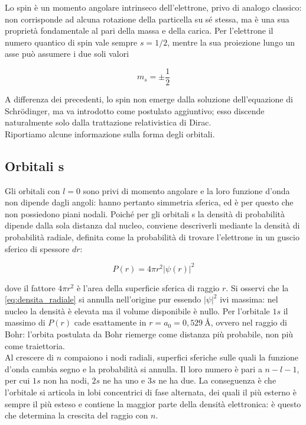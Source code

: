 Lo spin è un momento angolare intrinseco dell'elettrone, privo di analogo classico: non corrisponde ad alcuna rotazione della particella su sé stessa, ma è una sua proprietà fondamentale al pari della massa e della carica. 
Per l'elettrone il numero quantico di spin vale sempre $s = 1/2$, mentre la sua proiezione lungo un asse può assumere i due soli valori

\begin{equation}
    m_s = \pm \frac{1}{2}
    \label{eq:spin}
\end{equation}

A differenza dei precedenti, lo spin non emerge dalla soluzione dell'equazione di Schrödinger, ma va introdotto come postulato aggiuntivo; esso discende naturalmente solo dalla trattazione relativistica di Dirac.\\

Riportiamo alcune informazione sulla forma degli orbitali.

\subsection{Orbitali s}

Gli orbitali con $l = 0$ sono privi di momento angolare e la loro funzione d'onda non dipende dagli angoli: hanno pertanto simmetria sferica, ed è per questo che non possiedono piani nodali. Poiché per gli orbitali s la densità di probabilità dipende dalla sola distanza dal nucleo, conviene descriverli mediante la densità di probabilità radiale, definita come la probabilità di trovare l'elettrone in un guscio sferico di spessore $dr$:

\begin{equation}
    P(r) = 4\pi r^2 |\psi(r)|^2
    \label{eq:densita_radiale}
\end{equation}

dove il fattore $4\pi r^2$ è l'area della superficie sferica di raggio $r$. Si osservi che la \eqref{eq:densita_radiale} si annulla nell'origine pur essendo $|\psi|^2$ ivi massima: nel nucleo la densità è elevata ma il volume disponibile è nullo. Per l'orbitale $1s$ il massimo di $P(r)$ cade esattamente in $r = a_0 = 0,529 \ \text{\AA}$, ovvero nel raggio di Bohr: l'orbita postulata da Bohr riemerge come distanza più probabile, non più come traiettoria.\\

Al crescere di $n$ compaiono i nodi radiali, superfici sferiche sulle quali la funzione d'onda cambia segno e la probabilità si annulla. Il loro numero è pari a $n - l - 1$, per cui $1s$ non ha nodi, $2s$ ne ha uno e $3s$ ne ha due. 
La conseguenza è che l'orbitale si articola in lobi concentrici di fase alternata, dei quali il più esterno è sempre il più esteso e contiene la maggior parte della densità elettronica: è questo che determina la crescita del raggio con $n$.

